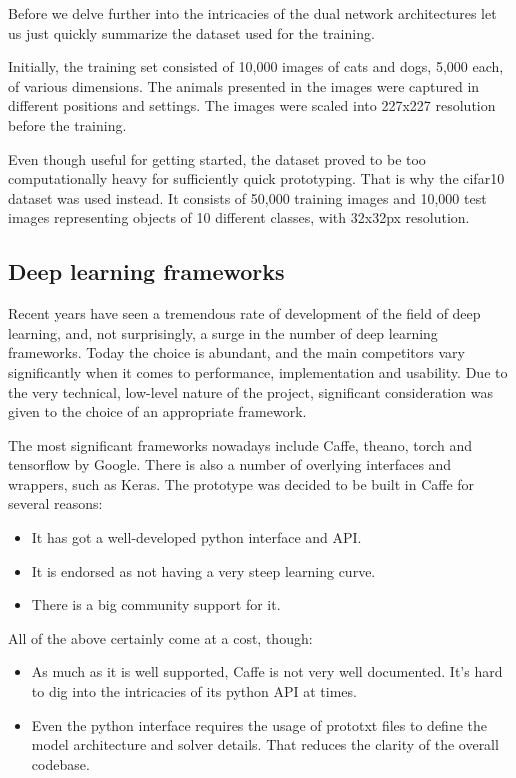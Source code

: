 \documentclass[a4paper, 12pt]{article}
\numberwithin{equation}{section}
\begin{document}
	Before we delve further into the intricacies of the dual network architectures let us just quickly summarize the dataset used for the training.
	
	Initially, the training set consisted of 10,000 images of cats and dogs, 5,000 each, of various dimensions. The animals presented in the images were captured in different positions and settings. The images were scaled into 227x227 resolution before the training.
	
	Even though useful for getting started, the dataset proved to be too computationally heavy for sufficiently quick prototyping. That is why the cifar10 dataset was used instead. It consists of 50,000 training images and 10,000 test images representing objects of 10 different classes, with 32x32px resolution.
	
	\subsection{Deep learning frameworks}
	Recent years have seen a tremendous rate of development of the field of deep learning, and, not surprisingly, a surge in the number of deep learning frameworks. Today the choice is abundant, and the main competitors vary significantly when it comes to performance, implementation and usability. Due to the very technical, low-level nature of the project, significant consideration was given to the choice of an appropriate framework.
	
	The most significant frameworks nowadays include Caffe, theano, torch and tensorflow by Google. There is also a number of overlying interfaces and wrappers, such as Keras. The prototype was decided to be built in Caffe for several reasons:
	
	\begin{itemize}
		\item It has got a well-developed python interface and API.
		\item It is endorsed as not having a very steep learning curve.
		\item There is a big community support for it.
	\end{itemize}
	
	All of the above certainly come at a cost, though:
	
	\begin{itemize}
		\item As much as it is well supported, Caffe is not very well documented. It's hard to dig into the intricacies of its python API at times.
		\item Even the python interface requires the usage of prototxt files to define the model architecture and solver details. That reduces the clarity of the overall codebase.
	\end{itemize}
	
\end{document}
